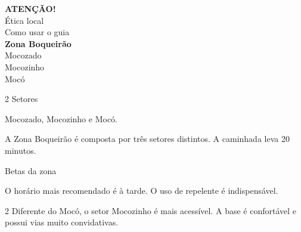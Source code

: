 \documentclass[11pt]{article}
\begin{document}
\CGIndexCorner
\CGIndexBackground

\vspace*{2mm}
{\setlength{\leftskip}{8mm}
\CGBaseFont\normalsize
\textbf{ATENÇÃO!}  \\
Ética local  \\
Como usar o guia  \\

\textbf{Zona Boqueirão}  \\
\hspace*{1em}Mocozado  \\
\hspace*{1em}Mocozinho  \\
\hspace*{1em}Mocó  \par
}

\clearpage


\begin{multicols}{2}
    {\CGTitleFont\LARGE\color{brand_color} Setores}\par\vspace{1pt}
    {\CGBaseFont\normalsize Mocozado, Mocozinho e Mocó.}\par\vspace{6pt}
    A Zona Boqueirão é composta por três setores distintos. A caminhada leva 20 minutos.
    \columnbreak

    {\CGTitleFont\LARGE\color{brand_color} Betas da zona}\par\vspace{1pt}
    O horário mais recomendado é à tarde. O uso de repelente é indispensável.\par\vspace{6pt}
    
\end{multicols}

\clearpage


\begin{multicols}{2}
    Diferente do Mocó, o setor Mocozinho é mais acessível. A base é confortável e possui vias muito convidativas.
    \columnbreak

\end{multicols}
\end{document}

